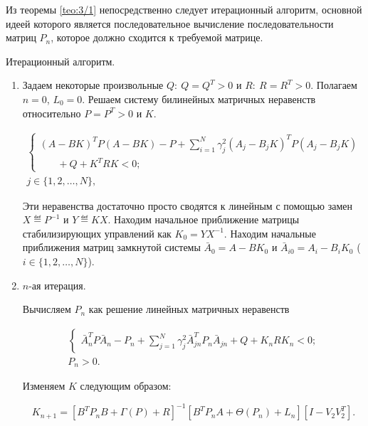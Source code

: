 Из теоремы \vref{teo:3/1} непосредственно следует итерационный алгоритм, основной идеей которого является последовательное вычисление последовательности матриц $P_n$, которое должно сходится к требуемой матрице.

\begin{alg}
\label{alg:4/4}

Итерационный алгоритм.

\begin{enumerate}

\item
Задаем некоторые произвольные $Q\colon~Q=Q^T>0$ и $R\colon~R=R^T>0$. Полагаем $n=0$, $L_0=0$. Решаем систему билинейных матричных неравенств относительно $P=P^T>0$ и $K$.

\begin{eqnarray}
\label{eq:4/17}
\left\{ \begin{array}{l}
(A-BK)^TP(A-BK) - P + \sum\limits_{i=1}^N \gamma_j^2(A_j-B_jK)^TP(A_j-B_jK) \\
~~~~~~~~+ Q + K^TRK < 0\mbox{;} \nonumber
\end{array} \right. \\
j \in \{1,2,\ldots,N\}\mbox{,} \nonumber
\end{eqnarray}

Эти неравенства достаточно просто сводятся к линейным с помощью замен $X \eqdef P^{-1}$ и $Y \eqdef KX$. Находим начальное приближение матрицы стабилизирующих управлений как $K_0 = YX^{-1}$. Находим начальные приближения матриц замкнутой системы $\bar{A}_0 = A-BK_0$ и $\bar{A}_{i0} = A_i - B_iK_0$ ($i \in \{1,2,\ldots,N\}$).


\item
$n$-ая итерация.\br

Вычисляем $P_n$ как решение линейных матричных неравенств

\begin{eqnarray}
\label{eq:4/18}
\left\{ \begin{array}{l}
\bar{A}_n^TP\bar{A}_n - P_n + \sum\limits_{j=1}^N \gamma_j^2\bar{A}_{jn}^TP_n\bar{A}_{jn} + Q + K_nRK_n < 0\mbox{;}
\end{array} \right. \\
P_n > 0\mbox{.} \nonumber
\end{eqnarray}

Изменяем $K$ следующим образом:

\begin{equation}
\label{eq:4/19}
K_{n+1} = [B^TP_nB + \Gamma(P) + R]^{-1}[B^TP_nA + \Theta(P_n) + L_n][I - V_2V_2^T]\mbox{.}
\end{equation}


\end{enumerate}
\end{alg}

